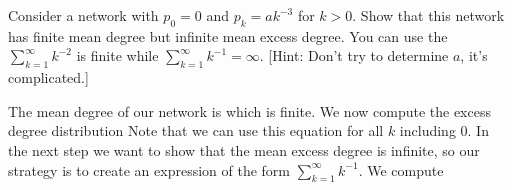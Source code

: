Consider a network with $p_0=0$ and $p_k=a k^{-3}$ for $k>0$. Show that this network has finite mean degree but infinite mean excess degree. You can use the $\sum_{k=1}^\infty k^{-2}$ is finite while $\sum_{k=1}^\infty k^{-1}=\infty$. [Hint: Don't try to determine $a$, it's complicated.]

\solution
The mean degree of our network is 
which is finite. We now compute the excess degree distribution 
Note that we can use this equation for all $k$ including 0.  
In the next step we want to show that the mean excess degree is infinite, so our strategy is to create an expression of the form $\sum_{k=1}^\infty k^{-1}$. We compute
